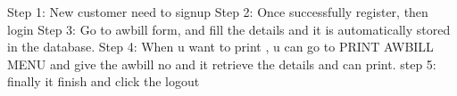 Step 1: New customer need to signup
Step 2: Once successfully register, then login
Step 3: Go to awbill form, and fill the details and it is automatically stored in the database.
Step 4: When u want to print , u can go to PRINT AWBILL MENU and give the awbill no and it retrieve the 
details and can print.
step 5: finally it finish and click the logout 